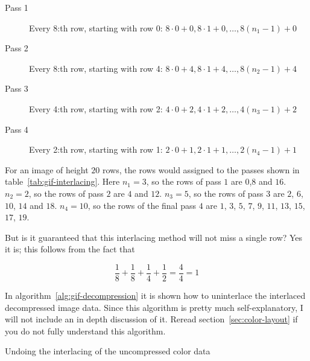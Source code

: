 \newcommand{\passrows}[3]{$#1 \cdot 0 + #2, #1 \cdot 1 + #2, \dots,
  #1(n_{#3}-1) + #2$}

\begin{description}
\item[Pass 1] Every 8:th row, starting with row 0: \passrows{8}{0}{1}
\item[Pass 2] Every 8:th row, starting with row 4: \passrows{8}{4}{2}
\item[Pass 3] Every 4:th row, starting with row 2: \passrows{4}{2}{3}
\item[Pass 4] Every 2:th row, starting with row 1: \passrows{2}{1}{4}
\end{description}

For an image of height $20$ rows, the rows would assigned to the
passes shown in table~\ref{tab:gif-interlacing}. Here $n_1 =
3$, so the rows of pass $1$ are $0$,$8$ and $16$. $n_2 = 2$, so the
rows of pass $2$ are $4$ and $12$. $n_3 = 5$, so the rows of pass $3$
are $2$, $6$, $10$, $14$ and $18$. $n_4 = 10$, so the rows of the
final pass $4$ are $1$, $3$, $5$, $7$, $9$, $11$, $13$, $15$, $17$,
$19$.

But is it guaranteed that this interlacing method will not miss a single
row? Yes it is; this follows from the fact that

\begin{equation*}
  \frac{1}{8} + \frac{1}{8} + \frac{1}{4} + \frac{1}{2} = \frac{4}{4}
  = 1
\end{equation*}

In algorithm~\ref{alg:gif-decompression} it is shown how to
uninterlace the interlaced decompressed image data.  Since this
algorithm is pretty much self-explanatory, I will not include an in
depth discussion of it. Reread section~\ref{sec:color-layout} if you
do not fully understand this algorithm.

\begin{algorithm}[H]
  \caption{Undoing the interlacing of the uncompressed \gif color data}
  \label{alg:gif-interlace}
  \begin{algorithmic}[1]






    \EndForTo


    \EndWhile

    \EndForTo

  \end{algorithmic}
\end{algorithm}

